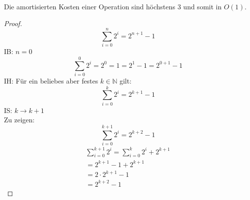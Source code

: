 \documentclass{article}
\begin{document}
Die amortisierten Kosten einer Operation sind höchstens $3$ und somit in $O(1)$.
\newpage
\begin{proof}


\begin{equation}
\sum_{i=0}^{n} 2^{i}=2^{n+1}-1
\end{equation}
IB: $n=0$ \\
\begin{equation}
\sum_{i=0}^{0} 2^{i}= 2^0 = 1 = 2^1-1 =2^{0+1}-1
\end{equation}
IH: Für ein beliebes aber festes $k \in \mathbb{N}$ gilt: 
\begin{equation}
\sum_{i=0}^{k} 2^{i}=2^{k+1}-1
\end{equation}
IS: $k \rightarrow k+1$\\
Zu zeigen:
\begin{equation}
 \sum_{i=0}^{k+1} 2^{i}=2^{k+2}-1
\end{equation}
\begin{align*}
 \sum_{i=0}^{k+1} 2^{i}=\sum_{i=0}^{k} 2^{i} +2^{k+1} \\
 =2^{k+1}-1+2^{k+1} \\
 =2\cdot2^{k+1}-1 \\
 =2^{k+2}-1
\end{align*}

\end{proof}
\end{document}
